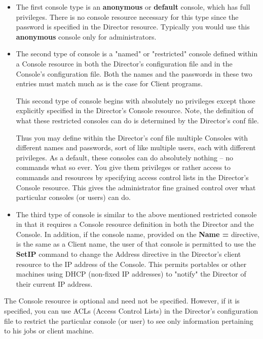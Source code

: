 \begin{itemize}
\item The first console type is an {\bf anonymous} or {\bf default}
console, which has full privileges.  There is no console resource
necessary for this type since the password is specified in the Director
resource.  Typically you would use this {\bf anonymous} console
only for administrators.

\item The second type of console is a
"named" or "restricted" console defined within a Console resource in
both the Director's configuration file and in the Console's
configuration file.  Both the names and the passwords in these two
entries must match much as is the case for Client programs.

This second type of console begins with absolutely no privileges except
those explicitly specified in the Director's Console resource.  Note,
the definition of what these restricted consoles can do is determined
by the Director's conf file.

Thus you may define within the Director's conf file multiple Consoles
with different names and passwords, sort of like multiple users, each
with different privileges.  As a default, these consoles can do
absolutely nothing -- no commands what so ever.  You give them
privileges or rather access to commands and resources by specifying
access control lists in the Director's Console resource.  This gives the
administrator fine grained control over what particular consoles (or
users) can do.

\item The third type of console is similar to the above mentioned
restricted console in that it requires a Console resource definition in
both the Director and the Console.  In addition, if the console name,
provided on the {\bf Name =} directive, is the same as a Client name,
the user of that console is permitted to use the {\bf SetIP} command to
change the Address directive in the Director's client resource to the IP
address of the Console.  This permits portables or other machines using
DHCP (non-fixed IP addresses) to "notify" the Director of their current
IP address.
\end{itemize}

The Console resource is optional and need not be specified. However, if it is
specified, you can use ACLs (Access Control Lists) in the Director's
configuration file to restrict the particular console (or user) to see only
information pertaining to his jobs or client machine.

